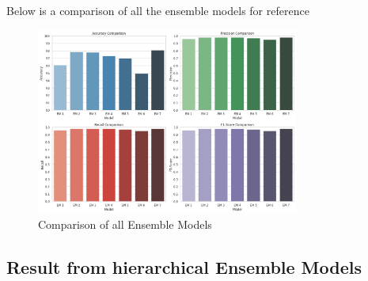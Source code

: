 \vspace{1em}

\noindent
Below is a comparison of all the ensemble models for reference

\begin{figure}[h!]  
    \centering
    \includegraphics[width=0.77\textwidth]{Images/EM COMPARE.png}  
    \caption{Comparison of all Ensemble Models}
    \label{lstm arch}  %
\end{figure}


\pagebreak

\subsection{Result from hierarchical Ensemble Models}

